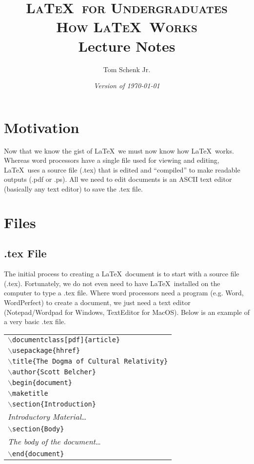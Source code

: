 \documentclass{article}
\title{\textsc{\LaTeX\ for Undergraduates\\
			How \LaTeX\ Works} \\
			Lecture Notes}
\author{Tom Schenk Jr.}
\date{\textit{Version of \today}}
\begin{document}
\maketitle

\section{Motivation}

Now that we know the gist of \LaTeX\, we must now know how \LaTeX\ works. Whereas word processors have a single file used for viewing and editing, \LaTeX\ uses a source file (.tex) that is edited and ``compiled'' to make readable outputs (.pdf or .ps). All we need to edit documents is an ASCII text editor (basically any text editor) to save the .tex file.

\section{Files}

\subsection{.tex File}

The initial process to creating a \LaTeX\ document is to start with a source file (.tex). Fortunately, we do not even need to have \LaTeX\ installed on the computer to type a .tex file. Where word processors need a program (e.g. Word, WordPerfect) to create a document, we just need a text editor (Notepad/Wordpad for Windows, TextEditor for MacOS). Below is an example of a very basic .tex file.
\begin{center}
\begin{tabular}{l}
\texttt{$\backslash$documentclass[pdf]\{article\}} \\
\texttt{$\backslash$usepackage\{hhref\}} \\
\texttt{$\backslash$title\{The Dogma of Cultural Relativity\}} \\
\texttt{$\backslash$author\{Scott Belcher\}} \\
\texttt{$\backslash$begin\{document\}} \\
\texttt{$\backslash$maketitle} \\
\texttt{$\backslash$section\{Introduction\}} \\
\textit{Introductory Material}\ldots \\
\texttt{$\backslash$section\{Body\}} \\
\textit{The body of the document}\ldots \\
\texttt{$\backslash$end\{document\}} \\
\end{tabular}
\end{center}
\end{document}
